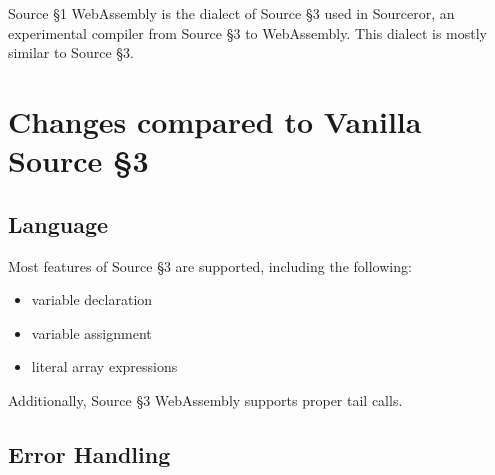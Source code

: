 


\newcommand{\Rule}[2]{\genfrac{}{}{0.7pt}{}{{\setlength{\fboxrule}{0pt}\setlength{\fboxsep}{3mm}\fbox{$#1$}}}{{\setlength{\fboxrule}{0pt}\setlength{\fboxsep}{3mm}\fbox{$#2$}}}}

\newcommand{\TruE}{\textbf{\texttt{true}}}
\newcommand{\FalsE}{\textbf{\texttt{false}}}
\newcommand{\Rc}{\texttt{\}}}
\newcommand{\Lc}{\texttt{\{}}
\newcommand{\Rp}{\texttt{)}}
\newcommand{\Lp}{\texttt{(}}
\newcommand{\Fun}{\textbf{\texttt{function}}}
\newcommand{\Let}{\textbf{\texttt{let}}}
\newcommand{\Return}{\textbf{\texttt{return}}}
\newcommand{\Const}{\textbf{\texttt{const}}}
\newcommand{\If}{\textbf{\texttt{if}}}
\newcommand{\Else}{\textbf{\texttt{else}}}
\newcommand{\Bool}{\texttt{bool}}
\newcommand{\Number}{\texttt{number}}
\newcommand{\String}{\texttt{string}}
\newcommand{\Undefined}{\texttt{undefined}}

\newtheorem{definition}{Definition}[section]



Source \S 1 WebAssembly is the dialect of Source \S 3 used in Sourceror, an experimental compiler from Source \S 3 to WebAssembly.  This dialect is mostly similar to Source \S 3.

\section{Changes compared to Vanilla Source \S 3}

\subsection*{Language}  

Most features of Source \S 3 are supported, including the following: 
\begin{itemize}
\item variable declaration
\item variable assignment
\item literal array expressions
\end{itemize}
Additionally, Source \S 3 WebAssembly supports proper tail calls.

\subsection*{Error Handling}

